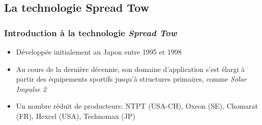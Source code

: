 \documentclass[first,firstsupp,lastsupp,handout,last,hyperref,table]{ETHclass}
\begin{document}
\subsection{La technologie Spread Tow}

\begin{frame}
\frametitle{Introduction \`a la technologie \textit{Spread Tow}}
\vspace{-0.25cm}
\centering
\begin{itemize}
	\item {\small D\'evelopp\'ee initialement au Japon entre 1995 et 1998}
	\item {\small Au cours de la derni\`ere d\'ecennie, son domaine d'application s'est \'elargi \`a partir des \'equipements sportifs jusqu'\`a structures primaires, comme \textit{Solar Impulse 2}}
	\item {\small Un nombre r\'eduit de producteurs: NTPT (USA-CH), Oxeon (SE), Chomarat (FR), Hexcel (USA), Technomax (JP)}
\end{itemize}
\begin{figure}[!h]
\centering
{}\quad
{}
  \label{fig:thin-ply-examples}
\end{figure}
\end{frame}
\end{document}
